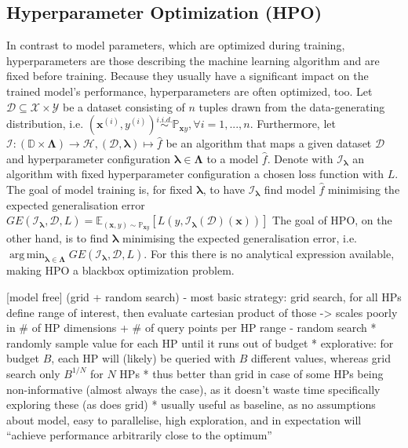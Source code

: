 \documentclass[twoside,11pt]{article}
\DeclareMathOperator*{\argmin}{arg\,min}
\begin{document}
\subsection{Hyperparameter Optimization (HPO)}
In contrast to model parameters, which are optimized during training, hyperparameters are those describing the machine learning algorithm and are fixed before training.
Because they usually have a significant impact on the trained model's performance, hyperparameters are often optimized, too.
Let $\mathcal{D}\subseteq\mathcal{X}\times\mathcal{Y}$ be a dataset consisting of $n$
tuples drawn from the data-generating distribution, i.e. $(\boldsymbol{x}^{(i)}, y^{(i)})\stackrel{i.i.d.}{\sim}\mathbb{P}_{\boldsymbol{x}y},\forall i=1,...,n$.
Furthermore, let $\mathcal{I}:(\mathbb{D}\times\boldsymbol\Lambda)\rightarrow\mathcal{H}, (\mathcal{D},\boldsymbol\lambda)\mapsto\hat{f}$
be an algorithm that maps a given dataset $\mathcal{D}$ and hyperparameter configuration $\boldsymbol\lambda\in\boldsymbol\Lambda$ to a model $\hat{f}$.
Denote with $\mathcal{I}_{\boldsymbol\lambda}$ an algorithm with fixed hyperparameter configuration a chosen loss function with $L$.
The goal of model training is, for fixed $\boldsymbol\lambda$, to have $\mathcal{I}_{\boldsymbol\lambda}$ find model $\hat{f}$ minimising the expected generalisation error
$GE(\mathcal{I}_{\boldsymbol\lambda},\mathcal{D},L)=\mathbb{E}_{(\boldsymbol{x},y)\sim\mathbb{P}_{\boldsymbol{x}y}}[L(y,\mathcal{I}_{\boldsymbol\lambda}(\mathcal{D})(\boldsymbol{x}))]$
The goal of HPO, on the other hand, is to find $\boldsymbol\lambda$ minimising the expected generalisation error,
i.e. $\argmin_{\boldsymbol\lambda\in\boldsymbol\Lambda} GE(\mathcal{I}_{\boldsymbol\lambda},\mathcal{D},L)$.
For this there is no analytical expression available, making HPO a blackbox optimization problem.  \citep[pp. 2f]{10.1145/3610536}

[model free]
(grid + random search)
- most basic strategy: grid search, for all HPs define range of interest, then evaluate cartesian product of those -> scales poorly in \# of HP dimensions + \# of query points per HP range
- random search
  * randomly sample value for each HP until it runs out of budget
  * explorative: for budget $B$, each HP will (likely) be queried with $B$ different values, whereas grid search only $B^{1/N}$ for $N$ HPs
  * thus better than grid in case of some HPs being non-informative (almost always the case), as it doesn't waste time specifically exploring these (as does grid)
  * usually useful as baseline, as no assumptions about model, easy to parallelise, high exploration, and in expectation will ``achieve performance arbitrarily close to the optimum''
\end{document}

